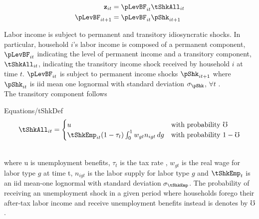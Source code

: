 \documentclass[titlepage]{\econtex}\providecommand{\texname}{BufferStockTheory}
\providecommand{\EqDir}{Equations}
\begin{document}
\begin{align*}
\mathbf{z}_{it} &= \pLevBF_{it}\tShkAll_{it} \\
\pLevBF_{it+1} &=\pLevBF_{it} \pShk_{it+1} \\
\end{align*}


Labor income is subject to permanent and transitory idiosyncratic shocks. In particular, household $i$'s labor income is composed of a permanent component, $\pLevBF_{it} $ indicating the level of permanent income and a transitory component, $\tShkAll_{it} $, indicating the transitory income shock received by household $i$ at time $t$. $\pLevBF_{it} $ is subject to permanent income shocks $\pShk_{it+1}$ where $\pShk_{it}$ is iid mean one lognormal with standard deviation $\sigma_\pShk$, $\forall t$ . \\



The transitory component follows   \\
\begin{verbatimwrite}{\EqDir/tShkDef}
\begin{equation}
\tShkAll _{it}=
\begin{cases}
 u \phantom{_{t+1}/\pNotZero} & \text{with probability $\mho $} \\
 \tShkEmp_{it} (1-\tau_{t})\int_{0}^{1} w_{gt}n_{igt} \, dg      & \text{with probability $1 - \mho  $} 
\end{cases} \label{eq:tShkDef}
\end{equation}
\end{verbatimwrite}
\\
where u is unemployment benefits, $\tau_{t}$ is the tax rate , $w_{gt}$ is the real wage for labor type $g$ at time t, $ n_{igt}$ is the labor supply for labor type $g$ and $\tShkEmp_{t}$ is an iid mean-one lognormal with standard deviation $\sigma_{\tShkEmp}$.  The probability of receiving an unemployment shock in a given period where households forego their after-tax labor income and receive unemployment benefits instead is denotes by $\mho$.  \\ 



\begin{comment}
Combining the transition equations, the recursive nature of
the problem allows us to rewrite it more compactly in Bellman equation form,
\begin{eqnarray*}
\VFunc_{t}(\mLevBF_{t},\pLevBF_{t}) & = & \max_{\cLevBF_{t}}~\left\{\util(\cLevBF_{t})+\DiscFac \Ex_{t}\left[ \VFunc_{t+1}((\mLevBF_{t}-\cLevBF_{t})\Rfree+ \pLevBF_{t+1}\tShkAll_{t+1},\pLevBF_{t} \PGro  \pShk_{t+1})\right]\right\}
.
\end{eqnarray*}
\end{comment} 
\end{document}
